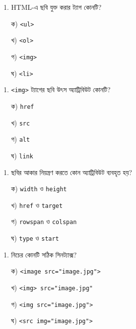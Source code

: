 \par\addvspace{4pt}\noindent
\begin{minipage}[t]{.48\linewidth}\vspace{0pt}
\begin{enumerate}[start=1,leftmargin=*,topsep=0pt,itemsep=0pt]
\item HTML-এ ছবি যুক্ত করার ট্যাগ কোনটি?
\par ক) \texttt{<ul>}
\par খ) \texttt{<ol>}
\par গ) \texttt{<img>}
\par ঘ) \texttt{<li>}
\end{enumerate}
\end{minipage}\hfill
\begin{minipage}[t]{.48\linewidth}\vspace{0pt}
\begin{enumerate}[start=2,leftmargin=*,topsep=0pt,itemsep=0pt]
\item \texttt{<img>} ট্যাগের ছবি উৎস অ্যাট্রিবিউট কোনটি?
\par ক) \texttt{href}
\par খ) \texttt{src}
\par গ) \texttt{alt}
\par ঘ) \texttt{link}
\end{enumerate}
\end{minipage}
\par
\par\addvspace{4pt}\noindent
\begin{minipage}[t]{.48\linewidth}\vspace{0pt}
\begin{enumerate}[start=3,leftmargin=*,topsep=0pt,itemsep=0pt]
\item ছবির আকার নিয়ন্ত্রণ করতে কোন অ্যাট্রিবিউট ব্যবহৃত হয়?
\par ক) \texttt{width} ও \texttt{height}
\par খ) \texttt{href} ও \texttt{target}
\par গ) \texttt{rowspan} ও \texttt{colspan}
\par ঘ) \texttt{type} ও \texttt{start}
\end{enumerate}
\end{minipage}\hfill
\begin{minipage}[t]{.48\linewidth}\vspace{0pt}
\begin{enumerate}[start=4,leftmargin=*,topsep=0pt,itemsep=0pt]
\item নিচের কোনটি সঠিক সিনট্যাক্স?
\par ক) \texttt{<image src="image.jpg">}
\par খ) \texttt{<img> src="image.jpg"}
\par গ) \texttt{<img src="image.jpg">}
\par ঘ) \texttt{<src img="image.jpg">}
\end{enumerate}
\end{minipage}
